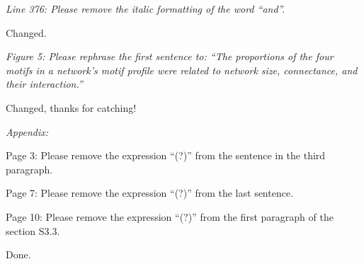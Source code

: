 \documentclass[12pt]{article}
\newcommand{\us}{\rm \setlength{\leftskip}{0.3cm} \setlength{\rightskip}{0.3cm}}
\newcommand{\them}{\it \setlength{\leftskip}{0cm} \setlength{\rightskip}{0cm}}
\begin{document}
\them
Line 376: Please remove the italic formatting of the word “and”.

\us
Changed.

\them
Figure 5: Please rephrase the first sentence to: “The proportions of the four motifs in a network's motif profile were related to network size, connectance, and their interaction.”

\us
Changed, thanks for catching!

\them
Appendix:

Page 3: Please remove the expression “(?)” from the sentence in the third paragraph.

Page 7: Please remove the expression “(?)” from the last sentence.

Page 10: Please remove the expression “(?)” from the first paragraph of the section S3.3.

\us
Done.
\end{document}
